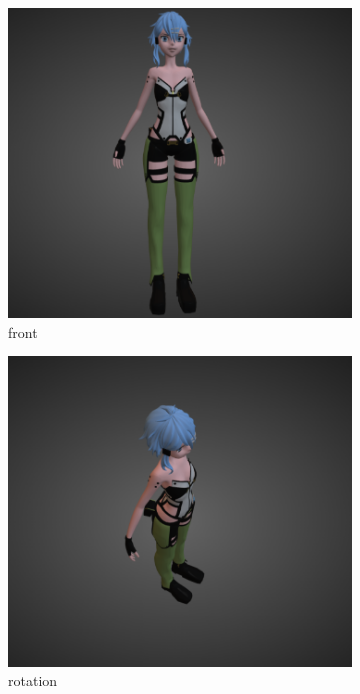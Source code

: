 \documentclass[12pt]{article}
\begin{document}
    \begin{figure}[!h]
        \begin{subfigure}{.5\textwidth}
          \centering
          \includegraphics[width=.8\linewidth]{images/front.png}
          \caption{front}
          \label{fig:sfig1}
        \end{subfigure}%
        \begin{subfigure}{.5\textwidth}
          \centering
          \includegraphics[width=.8\linewidth]{images/Rotation.png}
          \caption{rotation}
          \label{fig:sfig2}
        \end{subfigure}
        \\
        \begin{subfigure}{.5\textwidth}
            \centering

\end{subfigure}
\end{figure}
\end{document}
